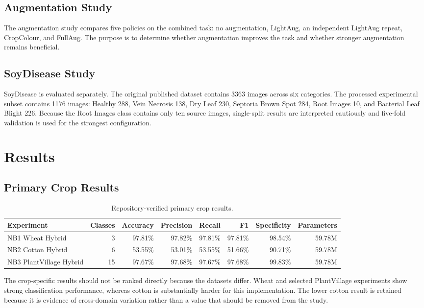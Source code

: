 \documentclass[a4paper,fleqn]{cas-dc}
\begin{document}
\subsection{Augmentation Study}
The augmentation study compares five policies on the combined task: no augmentation, LightAug, an independent LightAug repeat, CropColour, and FullAug. The purpose is to determine whether augmentation improves the task and whether stronger augmentation remains beneficial.

\subsection{SoyDisease Study}
SoyDisease is evaluated separately. The original published dataset contains 3363 images across six categories. The processed experimental subset contains 1176 images: Healthy 288, Vein Necrosis 138, Dry Leaf 230, Septoria Brown Spot 284, Root Images 10, and Bacterial Leaf Blight 226. Because the Root Images class contains only ten source images, single-split results are interpreted cautiously and five-fold validation is used for the strongest configuration.

\section{Results}
\subsection{Primary Crop Results}
\begin{table}[!t]
\centering
\caption{Repository-verified primary crop results.}
\label{tab:primary}
\begin{tabular}{lrrrrrrr}
\toprule
Experiment & Classes & Accuracy & Precision & Recall & F1 & Specificity & Parameters \\
\midrule
NB1 Wheat Hybrid & 3 & 97.81\% & 97.82\% & 97.81\% & 97.81\% & 98.54\% & 59.78M \\
NB2 Cotton Hybrid & 6 & 53.55\% & 53.01\% & 53.55\% & 51.66\% & 90.71\% & 59.78M \\
NB3 PlantVillage Hybrid & 15 & 97.67\% & 97.68\% & 97.67\% & 97.68\% & 99.83\% & 59.78M \\
\bottomrule
\end{tabular}
\end{table}

The crop-specific results should not be ranked directly because the datasets differ. Wheat and selected PlantVillage experiments show strong classification performance, whereas cotton is substantially harder for this implementation. The lower cotton result is retained because it is evidence of cross-domain variation rather than a value that should be removed from the study.
\end{document}
